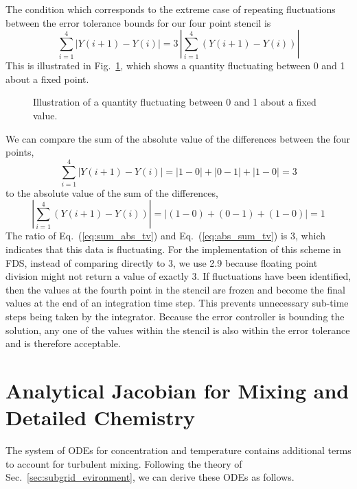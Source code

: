 The condition which corresponds to the extreme case of repeating fluctuations between the error tolerance bounds for our four point stencil is
\begin{equation}\label{eq:TV}
\sum_{i=1}^{4}|Y(i+1)-Y(i)| = 3 \, |\sum_{i=1}^{4}(Y(i+1)-Y(i))|
\end{equation}
This is illustrated in Fig.~\ref{fig:TV}, which shows a quantity fluctuating between 0 and 1 about a fixed point.
\begin{figure}
\begin{center}
\caption[Illustration of a quantity fluctuating about a fixed point]{\label{fig:TV} Illustration of a quantity fluctuating between 0 and 1 about a fixed value.}
\end{center}
\end{figure}
We can compare the sum of the absolute value of the differences between the four points,
\begin{equation}\label{eq:sum_abs_tv}
\displaystyle \sum_{i=1}^{4}|Y(i+1)-Y(i)| = |1-0| + |0-1| + |1-0| = 3
\end{equation}
to the absolute value of the sum of the differences,
\begin{equation}\label{eq:abs_sum_tv}
|\displaystyle \sum_{i=1}^{4}(Y(i+1)-Y(i))| = |(1-0)+(0-1)+(1-0)| = 1
\end{equation}
The ratio of Eq.~(\ref{eq:sum_abs_tv}) and Eq.~(\ref{eq:abs_sum_tv}) is 3, which indicates that this data is fluctuating. For the implementation of this scheme in FDS, instead of comparing directly to 3, we use 2.9 because floating point division might not return a value of exactly 3. If fluctuations have been identified, then the values at the fourth point in the stencil are frozen and become the final values at the end of an integration time step. This prevents unnecessary sub-time steps being taken by the integrator. Because the error controller is bounding the solution, any one of the values within the stencil is also within the error tolerance and is therefore acceptable.


\chapter{Analytical Jacobian for Mixing and Detailed Chemistry}
\label{chemistry_analytical_jacobian}

The system of ODEs for concentration and temperature contains additional terms to account for turbulent mixing. Following the theory of Sec.~\ref{sec:subgrid_evironment}, we can derive these ODEs as follows.

